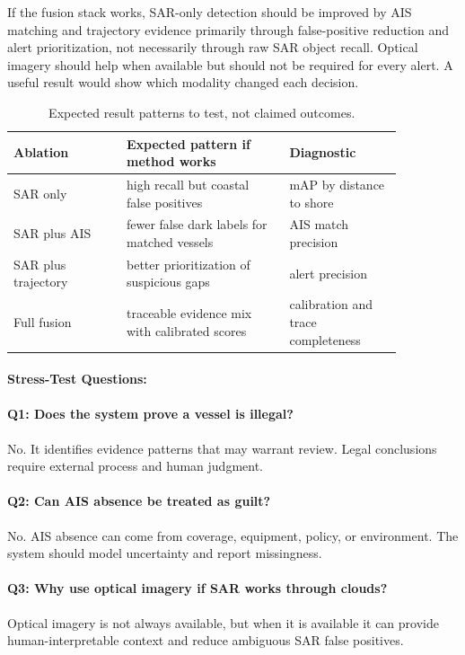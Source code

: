 \documentclass{article}
\begin{document}
If the fusion stack works, SAR-only detection should be improved by AIS matching and trajectory evidence primarily through false-positive reduction and alert prioritization, not necessarily through raw SAR object recall. Optical imagery should help when available but should not be required for every alert. A useful result would show which modality changed each decision.

\begin{table}[t]
\centering
\caption{Expected result patterns to test, not claimed outcomes.}
\begin{tabular}{@{}p{0.25\linewidth}p{0.36\linewidth}p{0.25\linewidth}@{}}
\toprule
\textbf{Ablation} & \textbf{Expected pattern if method works} & \textbf{Diagnostic}\\
\midrule
SAR only & high recall but coastal false positives & mAP by distance to shore\\
SAR plus AIS & fewer false dark labels for matched vessels & AIS match precision\\
SAR plus trajectory & better prioritization of suspicious gaps & alert precision\\
Full fusion & traceable evidence mix with calibrated scores & calibration and trace completeness\\
\bottomrule
\end{tabular}
\end{table}

\paragraph{Stress-Test Questions:}

\paragraph{Q1: Does the system prove a vessel is illegal?}
No. It identifies evidence patterns that may warrant review. Legal conclusions require external process and human judgment.

\paragraph{Q2: Can AIS absence be treated as guilt?}
No. AIS absence can come from coverage, equipment, policy, or environment. The system should model uncertainty and report missingness.

\paragraph{Q3: Why use optical imagery if SAR works through clouds?}
Optical imagery is not always available, but when it is available it can provide human-interpretable context and reduce ambiguous SAR false positives.
\end{document}
